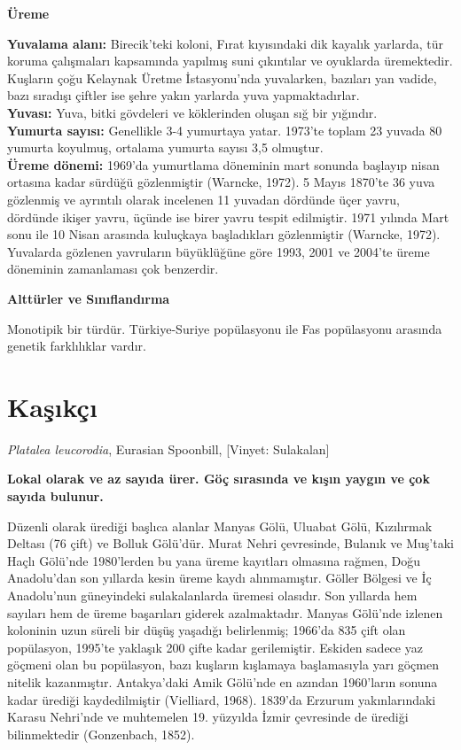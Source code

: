 \documentclass[
  a4paper,
  DIV=11,
  numbers=noendperiod]{scrreprt}
\begin{document}
\textbf{Üreme}

\textbf{Yuvalama alanı:} Birecik'teki koloni, Fırat kıyısındaki dik
kayalık yarlarda, tür koruma çalışmaları kapsamında yapılmış suni
çıkıntılar ve oyuklarda üremektedir. Kuşların çoğu Kelaynak Üretme
İstasyonu'nda yuvalarken, bazıları yan vadide, bazı sıradışı çiftler ise
şehre yakın yarlarda yuva yapmaktadırlar.\\
\textbf{Yuvası:} Yuva, bitki gövdeleri ve köklerinden oluşan sığ bir
yığındır.\\
\textbf{Yumurta sayısı:} Genellikle 3-4 yumurtaya yatar. 1973'te toplam
23 yuvada 80 yumurta koyulmuş, ortalama yumurta sayısı 3,5 olmuştur.\\
\textbf{Üreme dönemi:} 1969'da yumurtlama döneminin mart sonunda
başlayıp nisan ortasına kadar sürdüğü gözlenmiştir (Warncke, 1972). 5
Mayıs 1870'te 36 yuva gözlenmiş ve ayrıntılı olarak incelenen 11 yuvadan
dördünde üçer yavru, dördünde ikişer yavru, üçünde ise birer yavru
tespit edilmiştir. 1971 yılında Mart sonu ile 10 Nisan arasında
kuluçkaya başladıkları gözlenmiştir (Warncke, 1972). Yuvalarda gözlenen
yavruların büyüklüğüne göre 1993, 2001 ve 2004'te üreme döneminin
zamanlaması çok benzerdir.

\textbf{Alttürler ve Sınıflandırma}

Monotipik bir türdür. Türkiye-Suriye popülasyonu ile Fas popülasyonu
arasında genetik farklılıklar vardır.

\section{Kaşıkçı}\label{kaux15fux131kuxe7ux131}

\emph{Platalea leucorodia}, Eurasian Spoonbill, {[}Vinyet: Sulakalan{]}

\textbf{Lokal olarak ve az sayıda ürer. Göç sırasında ve kışın yaygın ve
çok sayıda bulunur.}

Düzenli olarak ürediği başlıca alanlar Manyas Gölü, Uluabat Gölü,
Kızılırmak Deltası (76 çift) ve Bolluk Gölü'dür. Murat Nehri çevresinde,
Bulanık ve Muş'taki Haçlı Gölü'nde 1980'lerden bu yana üreme kayıtları
olmasına rağmen, Doğu Anadolu'dan son yıllarda kesin üreme kaydı
alınmamıştır. Göller Bölgesi ve İç Anadolu'nun güneyindeki
sulakalanlarda üremesi olasıdır. Son yıllarda hem sayıları hem de üreme
başarıları giderek azalmaktadır. Manyas Gölü'nde izlenen koloninin uzun
süreli bir düşüş yaşadığı belirlenmiş; 1966'da 835 çift olan popülasyon,
1995'te yaklaşık 200 çifte kadar gerilemiştir. Eskiden sadece yaz
göçmeni olan bu popülasyon, bazı kuşların kışlamaya başlamasıyla yarı
göçmen nitelik kazanmıştır. Antakya'daki Amik Gölü'nde en azından
1960'ların sonuna kadar ürediği kaydedilmiştir (Vielliard, 1968).
1839'da Erzurum yakınlarındaki Karasu Nehri'nde ve muhtemelen 19.
yüzyılda İzmir çevresinde de ürediği bilinmektedir (Gonzenbach, 1852).
\end{document}
